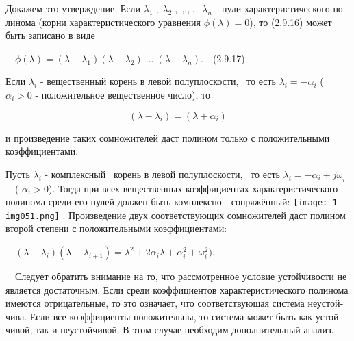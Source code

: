 \documentclass[a4paper]{article}
\begin{document}
{\begin{russian}\sffamily
Докажем это утверждение. Если  $λ_1\;,\;λ_2\;,\;\text{,,,}\;,\;\;λ_n$ - нули характеристического полинома (корни
характеристического уравнения  $ϕ(λ)=0$), то (2.9.16) может быть записано в виде
\end{russian}}

{\begin{russian}\sffamily
\ \  $ϕ(λ)=(λ-λ_1)(λ-λ_2)\;...\;(λ-λ_n)$.\ \ (2.9.17)
\end{russian}}

{\begin{russian}\sffamily
Если  $λ_i$ - вещественный корень в левой полуплоскости, \ то есть  $λ_i=-α_i$ ( $α_i>0$ - положительное вещественное
число), то
\end{russian}}

\begin{equation*}
(λ-λ_i)=(λ+α_i)
\end{equation*}
{\begin{russian}\sffamily
и произведение таких сомножителей даст полином только с положительными коэффициентами.
\end{russian}}

{\begin{russian}\sffamily
Пусть  $λ_i$ - комплексный \ корень в левой полуплоскости, \ то есть  $λ_i=-α_i+\mathit{jω}_i$ \ \ ( $α_i>0$). Тогда при
всех вещественных коэффициентах характеристического полинома среди его нулей должен быть комплексно - сопряжённый: 
\texttt{[image: 1-img051.png]} . Произведение двух соответствующих сомножителей даст
полином второй степени с положительными коэффициентами:
\end{russian}}

{\begin{russian}\sffamily
\ \  $(λ-λ_i)(λ-λ_{i+1})=λ^2+2α_iλ+α_i^2+ω_i^2)$.
\end{russian}}

{\begin{russian}\sffamily
\ \ Следует обратить внимание на то, что рассмотренное условие устойчивости не является достаточным. Если среди
коэффициентов характеристического полинома имеются отрицательные, то это означает, что соответствующая система
неустойчива. Если все коэффициенты положительны, то система может быть как устойчивой, так и неустойчивой. В этом
случае необходим дополнительный анализ.
\end{russian}}


\bigskip
\end{document}
